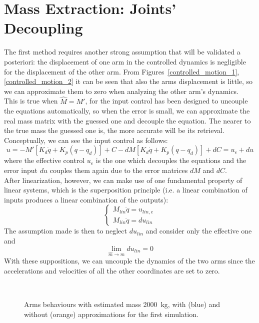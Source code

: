 \documentclass[a4paper,12pt,oneside]{report}
\begin{document}
\section{Mass Extraction: Joints' Decoupling} \label{decoupling}
The first method requires another strong assumption that will be validated a posteriori: the displacement of one arm in the controlled dynamics is negligible for the displacement of the other arm. From Figures~\ref{controlled_motion_1}, \ref{controlled_motion_2} it can be seen that also the arms displacement is little, so we can approximate them to zero when analyzing the other arm's dynamics.\\
This is true when $\hat{M}=M'$, for the input control has been designed to uncouple the equations automatically, so when the error is small, we can approximate the real mass matrix with the guessed one and decouple the equation. The nearer to the true mass the guessed one is, the more accurate will be its retrieval.\\
Conceptually, we can see the input control as follows:
\begin{equation}
  u=-M'[K_d\dot{q}+K_p(q-q_d)]+C-dM[K_d\dot{q}+K_p(q-q_d)]+dC=u_e+du
\end{equation}
where the effective control $u_e$ is the one which decouples the equations and the error input $du$ couples them again due to the error matrices $dM$ and $dC$.\\
After linearization, however, we can make use of one fundamental property of linear systems, which is the superposition principle (i.e. a linear combination of inputs produces a linear combination of the outputs):
\begin{equation}
  \begin{cases}
    M_{lin}\ddot{q}=u_{lin,e}\\
    M_{lin}\ddot{q}=du_{lin}
  \end{cases}
\end{equation}
The assumption made is then to neglect $du_{lin}$ and consider only the effective one and 
\begin{equation}
\lim_{\hat{m} \to m}du_{lin}=0
\end{equation}
With these suppositions, we can uncouple the dynamics of the two arms since the accelerations and velocities of all the other coordinates are set to zero.
\begin{figure}[h]
  \centering
   \\
  \caption{Arms behaviours with estimated mass \SI{2000}{\kilogram}, with (blue) and without (orange) approximations for the first simulation.}
  \label{approximations}
\end{figure}\\
\end{document}
